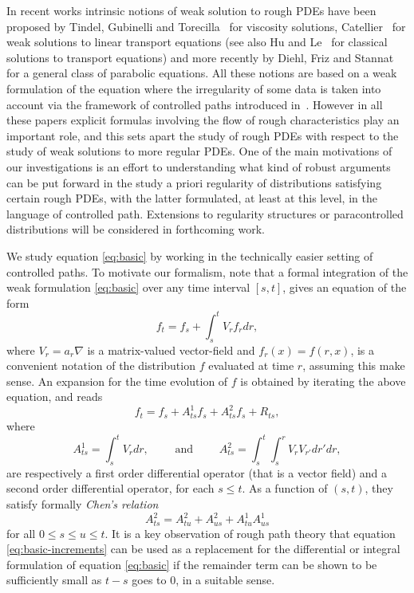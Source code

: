 \documentclass[11pt,a4paper]{amsart}
\renewcommand{\leq}{\leqslant}
\newcommand{\ssk}{\smallskip}
\numberwithin{equation}{section} %
\begin{document}
\ssk

In recent works intrinsic notions of weak solution to rough PDEs have been proposed by Tindel, Gubinelli and Torecilla~\cite{GTT} for viscosity solutions,  Catellier~\cite{CatellierTransport} for weak solutions to linear transport equations (see also Hu and Le~\cite{HuLe} for classical solutions to transport equations) and more recently by Diehl, Friz and Stannat~\cite{DiehlFrizStannat} for a general class of parabolic equations. All these notions are based on a weak formulation of the equation where the irregularity of some data is taken into account via the framework of controlled paths introduced in~\cite{Gubinelli04}. However in all these papers explicit formulas involving the flow of rough characteristics play an important role, and this sets apart the study of rough PDEs with respect to the study of weak solutions to more regular PDEs. One of the main motivations of our investigations is an effort to understanding what kind of robust arguments can be put forward in the study a priori regularity of distributions satisfying certain rough PDEs, with the latter formulated, at least at this level, in the language of controlled path. Extensions to regularity structures or paracontrolled distributions will be considered in forthcoming work. 

\bigskip

We study equation \eqref{eq:basic} by working in the technically easier setting of controlled paths. To motivate our formalism, note that a formal integration of the weak formulation \eqref{eq:basic} over any time interval $[s,t]$, gives an equation of the form
$$
f_t = f_s + \int_s^t V_r f_r dr, 
$$ 
where $V_r = a_r\nabla$ is a matrix-valued vector-field and $f_r(x) = f(r,x)$, is a convenient notation of the distribution $f$ evaluated at time $r$, assuming this make sense. An expansion for the time evolution of $f$ is obtained by iterating the above equation, and reads
\begin{equation}
\label{eq:basic-increments}
f_t = f_s + A^1_{ts} f_s + A^2_{ts} f_s + R_{ts},
\end{equation}
where
$$
A^1_{ts} = \int_s^t V_r  dr,\qquad\textrm{ and }\qquad A^2_{ts} = \int_s^t \int_s^r V_r V_{r'} dr' dr,
$$
are respectively a first order differential operator (that is a vector field) and a second order differential operator, for each $s\leq t$. As a function of $(s,t)$, they satisfy formally \textit{Chen's relation}
\begin{equation}
\label{eq:operator-chen}
A^2_{ts} =A^2_{tu}+ A^2_{us} + A^{1}_{tu}A^{1}_{us}
\end{equation}
for all $0\le s \le u \le t$. It is a key observation of rough path theory that equation \eqref{eq:basic-increments} can be used as a replacement for the differential or integral formulation 
of equation \eqref{eq:basic} if the remainder term can be shown to be sufficiently small as $t-s$ goes to $0$, in a suitable sense.
\end{document}
